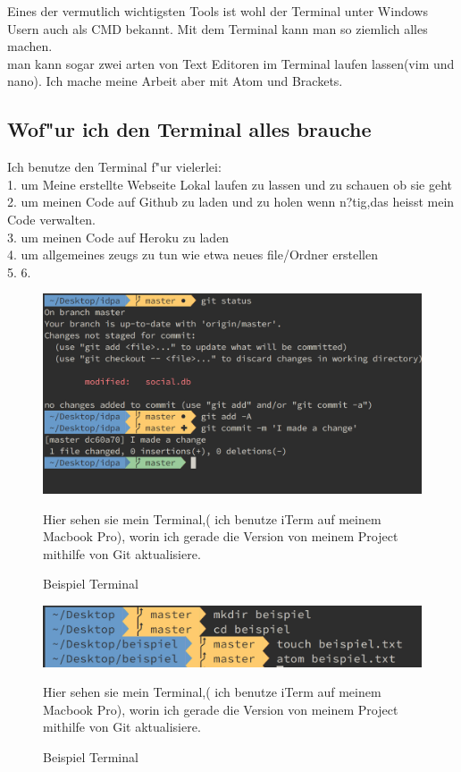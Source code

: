 \documentclass{article}
\begin{document}
Eines der vermutlich wichtigsten Tools ist wohl der Terminal unter Windows Usern auch als CMD bekannt.
Mit dem Terminal kann man so ziemlich alles machen.\\
man kann sogar zwei arten von Text Editoren im Terminal laufen lassen(vim und nano).
Ich mache meine Arbeit aber mit Atom und Brackets.\\
\subsection{Wof"ur ich den Terminal alles brauche}

Ich benutze den Terminal f"ur vielerlei:\\
1. um Meine erstellte Webseite Lokal laufen zu lassen und zu schauen ob sie geht\\
2. um meinen Code auf Github zu laden und zu holen wenn n?tig,das heisst mein Code verwalten.\\
3. um meinen Code auf Heroku zu laden\\
4. um allgemeines zeugs zu tun wie etwa neues file/Ordner erstellen\\
5.
6.\\



\begin{figure}[ht]
    \centering
    \includegraphics[width=.7\linewidth]{cli}
    \caption{Beispiel Terminal}
    \label{fig:sub1}{Hier sehen sie mein Terminal,(
    ich benutze iTerm auf meinem Macbook Pro),
    worin ich gerade
    die Version von meinem Project mithilfe von Git aktualisiere.}
    \end{figure}

    \cleardoublepage

    \begin{figure}[ht]
        \centering
        \includegraphics[width=.7\linewidth]{cli-einfaches}
        \caption{Beispiel Terminal}
        \label{fig:sub1}{Hier sehen sie mein Terminal,(
        ich benutze iTerm auf meinem Macbook Pro),
        worin ich gerade
        die Version von meinem Project mithilfe von Git aktualisiere.}
        \end{figure}
\end{document}
